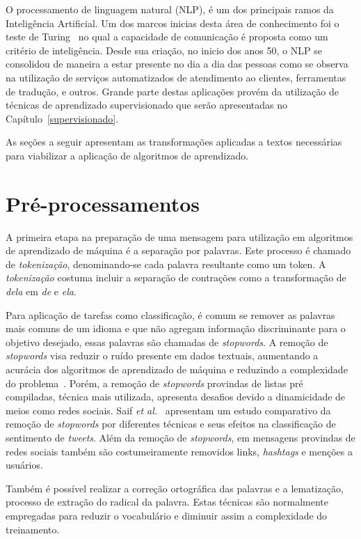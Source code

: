 O processamento de linguagem natural (NLP), é um dos principais ramos da Inteligência Artificial.
Um dos marcos inicias desta área de conhecimento foi o teste de Turing~\cite{turing50} no qual a capacidade
de comunicação é proposta como um critério de inteligência.
Desde sua criação, no inicio dos anos 50, o NLP se consolidou de maneira a estar presente no dia a dia das pessoas como
se observa na utilização de serviços automatizados de atendimento ao clientes, ferramentas de tradução, e outros.
Grande parte destas aplicações provém da utilização de técnicas de aprendizado supervisionado que serão apresentadas
no Capítulo~\ref{supervisionado}.

As seções a seguir apresentam as transformações aplicadas a textos necessárias para viabilizar a aplicação de algoritmos
de aprendizado.

\section{Pré-processamentos}

A primeira etapa na preparação de uma mensagem para utilização em algoritmos de aprendizado de máquina é a separação por
palavras.
Este processo é chamado de \textit{tokenização}, denominando-se cada palavra resultante como um token.
A \textit{tokenização} costuma incluir a separação de contrações como a transformação de \textit{dela} em \textit{de}
e \textit{ela}.


Para aplicação de tarefas como classificação, é comum se remover as palavras mais comuns de um idioma e que não
agregam informação discriminante para o objetivo desejado, essas palavras são chamadas de \textit{stopwords}.
A remoção de \textit{stopwords} visa reduzir o ruído presente em dados textuais, aumentando a acurácia dos algoritmos de
aprendizado de máquina e reduzindo a complexidade do problema~\cite{silva03}.
Porém, a remoção de \textit{stopwords} provindas de listas pré compiladas, técnica mais utilizada, apresenta desafios
devido a dinamicidade de meios como redes sociais.
Saif \textit{et al.}~\cite{saif14} apresentam um estudo comparativo da remoção de \textit{stopwords} por diferentes
técnicas e seus efeitos na classificação de sentimento de \textit{tweets}.
Além da remoção de \textit{stopwords}, em mensagens provindas de redes sociais também são costumeiramente removidos
links, \textit{hashtags} e menções a usuários.

Também é possível realizar a correção ortográfica das palavras e a lematização, processo de extração do radical da
palavra.
Estas técnicas são normalmente empregadas para reduzir o vocabulário e diminuir assim a complexidade do treinamento.

